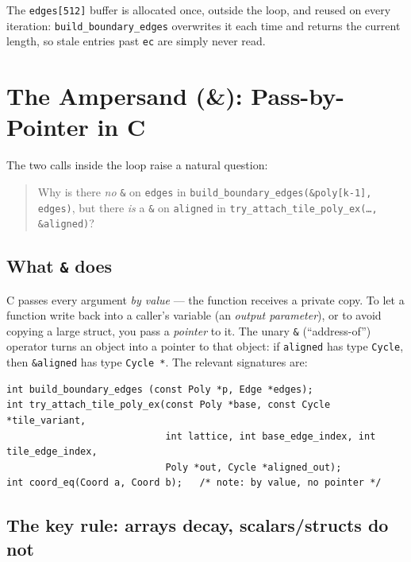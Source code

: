 \documentclass[10pt,a4paper]{article}
\let\polysection\section
\renewcommand\section{\needspace{0.16\textheight}\polysection}
\let\polysubsection\subsection
\renewcommand\subsection{\needspace{0.12\textheight}\polysubsection}
\newcommand{\code}[1]{\texttt{\small #1}}
\begin{document}
\noindent The \code{edges[512]} buffer is allocated once, outside the loop,
and reused on every iteration: \code{build\_boundary\_edges} overwrites it
each time and returns the current length, so stale entries past \code{ec}
are simply never read.

\section{The Ampersand (\&): Pass-by-Pointer in C}
\label{sec:amp}

The two calls inside the loop raise a natural question:

\begin{quote}
Why is there \emph{no} \code{\&} on \code{edges} in
\code{build\_boundary\_edges(\&poly[k-1], edges)}, but there \emph{is} a
\code{\&} on \code{aligned} in
\code{try\_attach\_tile\_poly\_ex(\ldots, \&aligned)}?
\end{quote}

\subsection{What \texttt{\&} does}

C passes every argument \emph{by value} — the function receives a private
copy.  To let a function write back into a caller's variable (an
\emph{output parameter}), or to avoid copying a large struct, you pass a
\emph{pointer} to it.  The unary \code{\&} (``address-of'') operator turns
an object into a pointer to that object: if \code{aligned} has type
\code{Cycle}, then \code{\&aligned} has type \code{Cycle *}.  The relevant
signatures are:

\begin{verbatim}
int build_boundary_edges (const Poly *p, Edge *edges);
int try_attach_tile_poly_ex(const Poly *base, const Cycle *tile_variant,
                            int lattice, int base_edge_index, int tile_edge_index,
                            Poly *out, Cycle *aligned_out);
int coord_eq(Coord a, Coord b);   /* note: by value, no pointer */
\end{verbatim}

\subsection{The key rule: arrays decay, scalars/structs do not}
\end{document}
